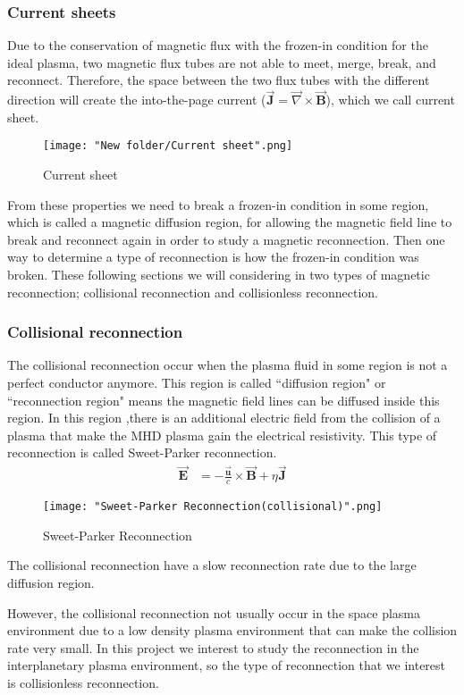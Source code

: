 \documentclass[12pt, a4paper]{article}
\begin{document}
		\subsubsection*{Current sheets}
		Due to the conservation of magnetic flux with the frozen-in condition for the ideal plasma, two magnetic flux tubes are not able to meet, merge, break, and reconnect. Therefore, the space between the two flux tubes with the different direction will create the into-the-page current ($\vec{\mathbf{J}}=\vec{\nabla}\times\vec{\mathbf{B}}$), which we call current sheet.
		\begin{figure}[hbtp]
		\centering
		\texttt{[image: "New folder/Current sheet".png]}
		\caption{Current sheet}
		\end{figure}	
From these properties we need to break a frozen-in condition in some region, which is called a magnetic diffusion region, for allowing the magnetic field line to break and reconnect again in order to study a magnetic reconnection.
		Then one way to determine a type of reconnection is how the frozen-in condition was broken. These following sections we will considering in two types of magnetic reconnection; collisional reconnection and collisionless reconnection.
		
		
		\subsubsection*{Collisional reconnection}
		The collisional reconnection occur when the plasma fluid in some region is not a perfect conductor anymore. This region is called “diffusion region" or  “reconnection region" means the magnetic field lines can be diffused inside this region. In this region ,there is an additional electric field from the collision of a plasma that make the MHD plasma gain the electrical resistivity. This type of reconnection is called Sweet-Parker reconnection.
		\begin{align*}
		\vec{\mathbf{E}}&=-\frac{\vec{\mathbf{u}}}{c}\times\vec{\mathbf{B}}+\eta\vec{\mathbf{J}}
		\end{align*}
		\begin{figure}[hbtp]
		\centering
		\texttt{[image: "Sweet-Parker Reconnection(collisional)".png]}
		\caption{Sweet-Parker Reconnection}
		\end{figure}\par
		The collisional reconnection have a slow reconnection rate due to the large diffusion region.
		\par
		However, the collisional reconnection not usually occur in the space plasma environment due to a low density plasma environment that can make the collision rate very small. In this project we interest to study the reconnection in the interplanetary plasma environment, so the type of reconnection that we interest is collisionless reconnection.
\end{document}
